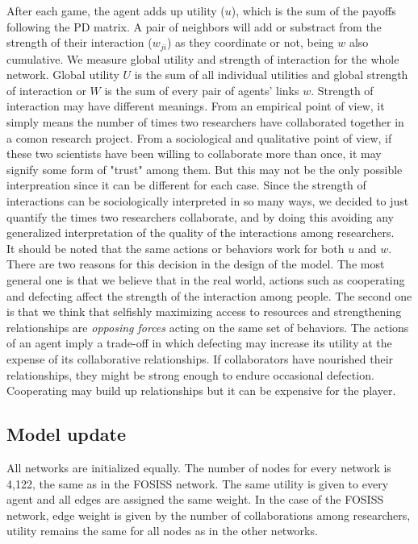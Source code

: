 \documentclass{bmcart}
\begin{document}
After each game, the agent adds up utility ($u$), which is the sum of the
payoffs following the PD matrix. A pair of neighbors will add or substract from the strength of
their interaction ($w_{ji}$) as they coordinate or not, being $w$
also cumulative. We measure global utility and strength of interaction for the whole
network. Global utility $U$ is the sum of all individual utilities and global
strength of interaction or $W$ is the sum of every pair of agents' links
$w$. Strength of interaction may have different meanings. From an empirical point of view, it simply means the number of times two researchers have collaborated together in a comon research project. From a sociological and qualitative point of view, if these two scientists have been willing to collaborate more than once, it may signify some form of "trust" among them. But this may not be the only possible interpreation since it can be different for each case. Since the strength of interactions can be sociologically interpreted in so many ways, we decided to just quantify the  times two researchers collaborate, and by doing this avoiding any generalized interpretation of the quality of the interactions among researchers. \\


It should be noted that the same actions or behaviors work for
  both $u$ and $w$. There are two reasons for this decision in the design of the
model. The most general one is that we believe that in the real world,
actions such as cooperating and defecting affect the strength of the interaction
among people. The second one is that we think that selfishly maximizing access to resources and
strengthening relationships are \emph{opposing forces} acting on the same set of
behaviors. The actions of an agent imply a trade-off in which defecting may
increase its utility at the expense of its collaborative relationships. If
collaborators have nourished their relationships, they might be strong enough to
endure occasional defection. Cooperating may build up relationships but it can be
expensive for the player.

\subsection*{Model update}

All networks are initialized equally. The number of nodes for every
network is 4,122, the same as in the FOSISS network.  The same utility
is given to every agent and all edges are assigned the same weight. In
the case of the FOSISS network, edge weight is given by the number of
collaborations among researchers, utility remains the same for all
nodes as in the other networks.\\
\end{document}
